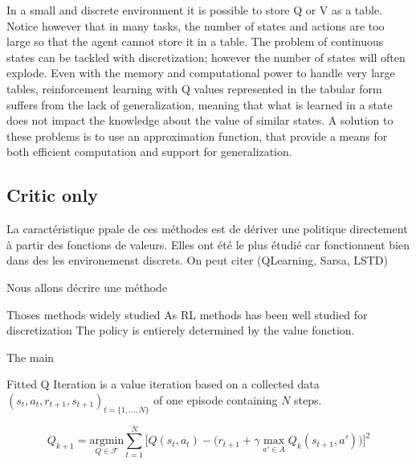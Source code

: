 In a small and discrete environment it is possible to store Q or V as a table.
Notice however that in many tasks, the number of states and actions are
too large so that the agent cannot store it in a table. The problem of
continuous states can be tackled with discretization; however the number of
states will often explode. Even with the memory and computational power to
handle very large tables, reinforcement learning with Q values represented in the
tabular form suffers from the lack of generalization, meaning that what is learned
in a state does not impact the knowledge about the value of similar states.
A solution to these problems is to use an approximation function, that provide
a means for both efficient computation and support for generalization.


% 


\subsection{Critic only}
La caractéristique ppale de ces méthodes est de dériver une politique directement à partir des fonctions
de valeurs. Elles ont été le plus étudié car fonctionnent bien dans des les environemenst discrets.
On peut citer (QLearning, Sarsa, LSTD)

Nous allons décrire une méthode 

Thoses methods
widely studied
As RL methods has been well studied for discretization
The policy is entierely determined by the value fonction.


The main 


Fitted Q Iteration \cite{Riedmiller2005} is a value iteration based on a collected data $(s_t, a_t,r_{t+1}, s_{t+1})_{t=\{1,...,N\}}$ of one episode containing $N$ steps.

\begin{equation}
 Q_{k+1} = \underset{Q \in \mathcal{F}}{\text{argmin}} \sum_{t=1}^{N} \Big[ Q(s_t, a_t) - \big( r_{t+1} + \gamma \underset{a' \in A}{\text{ max }} Q_k(s_{t+1}, a') \big) \Big]^2
\end{equation}

